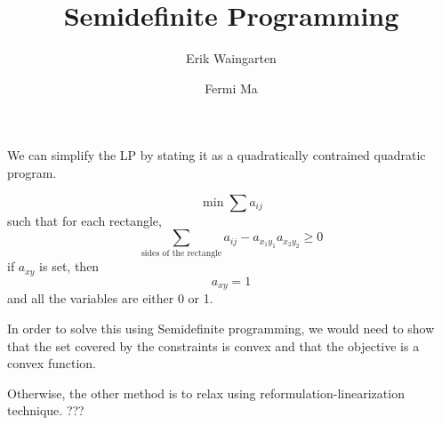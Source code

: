 \documentclass[11pt]{article}
\author{Erik Waingarten \and Fermi Ma}
\title{Semidefinite Programming}
\begin{document}
         
\maketitle

We can simplify the LP by stating it as a quadratically contrained quadratic program.

\[ \min \sum a_{ij} \]
such that for each rectangle,
\[ \sum_{\text{sides of the rectangle}} a_{ij} - a_{x_1y_1}a_{x_2y_2} \geq 0 \]
if $a_{xy}$ is set, then
\[ a_{xy} = 1\]
and all the variables are either 0 or 1. 

In order to solve this using Semidefinite programming, we would need to show that the set covered by the constraints is convex and that the objective is a convex function.

Otherwise, the other method is to relax using reformulation-linearization technique. ???
\end{document}
